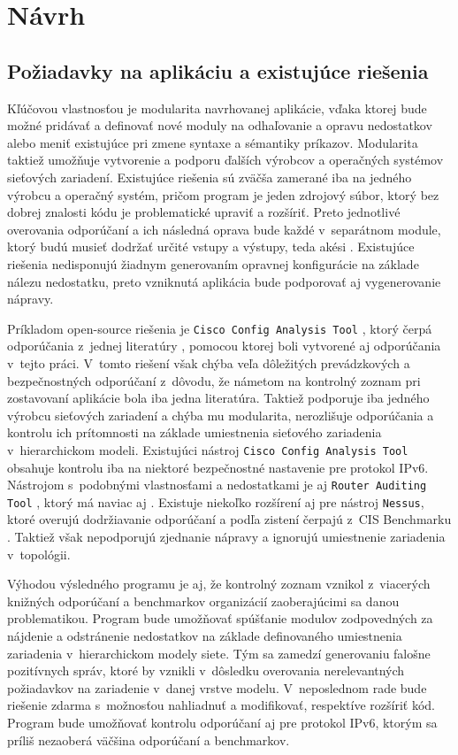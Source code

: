 \chapter{Návrh}

\section{Požiadavky na aplikáciu a existujúce riešenia}
Kľúčovou vlastnosťou je modularita navrhovanej aplikácie, vďaka ktorej bude možné pridávať a definovať nové moduly na odhaľovanie a opravu nedostatkov alebo meniť existujúce pri zmene syntaxe a sémantiky príkazov. Modularita taktiež umožňuje vytvorenie a podporu ďalších výrobcov a operačných systémov sieťových zariadení. Existujúce riešenia sú zväčša zamerané iba na jedného výrobcu a operačný systém, pričom program je jeden zdrojový súbor, ktorý bez dobrej znalosti kódu je problematické upraviť a rozšíriť. Preto jednotlivé overovania odporúčaní a ich následná oprava bude každé v~separátnom module, ktorý budú musieť dodržať určité vstupy a výstupy, teda akési . Existujúce riešenia nedisponujú žiadnym generovaním opravnej konfigurácie na základe nálezu nedostatku, preto  vzniknutá aplikácia bude podporovať aj vygenerovanie nápravy.

Príkladom open-source riešenia je \texttt{Cisco Config Analysis Tool} \cite{AU81CvNW4q8RGnqM}, ktorý čerpá odporúčania z~jednej literatúry \cite{Singh2018}, pomocou ktorej boli vytvorené aj odporúčania v~tejto práci. V~tomto riešení však chýba veľa dôležitých prevádzkových a bezpečnostných odporúčaní z~dôvodu, že námetom na kontrolný zoznam pri zostavovaní aplikácie bola iba jedna literatúra. Taktiež podporuje iba jedného výrobcu sieťových zariadení a chýba mu modularita, nerozlišuje odporúčania a kontrolu ich prítomnosti na základe umiestnenia sieťového zariadenia v~hierarchickom modeli. Existujúci nástroj \texttt{Cisco Config Analysis Tool} obsahuje kontrolu iba na niektoré bezpečnostné nastavenie pre protokol IPv6. Nástrojom s~podobnými vlastnosťami a nedostatkami je aj \texttt{Router Auditing Tool} \cite{OniomAfGpef53LHq}, ktorý má naviac aj . Existuje niekoľko rozšírení aj pre nástroj \texttt{Nessus}, ktoré overujú dodržiavanie odporúčaní a podľa zistení čerpajú z~CIS Benchmarku \cite{CIS_DrTLsgXv24lxeIIM}. Taktiež však nepodporujú zjednanie nápravy a ignorujú umiestnenie zariadenia v~topológii.     

Výhodou výsledného programu je aj, že kontrolný zoznam vznikol z~viacerých knižných odporúčaní a benchmarkov organizácií zaoberajúcimi sa danou problematikou. Program bude umožňovať spúšťanie modulov zodpovedných za nájdenie a odstránenie nedostatkov na základe definovaného umiestnenia zariadenia v~hierarchickom modely siete. Tým sa zamedzí generovaniu falošne pozitívnych správ, ktoré by vznikli v~dôsledku overovania nerelevantných požiadavkov na zariadenie v~danej vrstve modelu. V~neposlednom rade bude riešenie zdarma s~možnosťou nahliadnuť a modifikovať, respektíve rozšíriť kód. Program bude umožňovať kontrolu odporúčaní aj pre protokol IPv6, ktorým sa príliš nezaoberá väčšina odporúčaní a benchmarkov.

